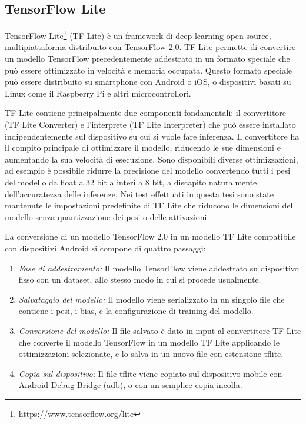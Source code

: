 \documentclass[12pt,italian]{report}
\begin{document}
\subsection{TensorFlow Lite}
TensorFlow Lite\footnote{\url{https://www.tensorflow.org/lite}} (TF Lite) è un framework di deep learning open-source, multipiattaforma distribuito con TensorFlow 2.0. TF Lite permette di convertire un modello TensorFlow precedentemente addestrato in un formato speciale che può essere ottimizzato in velocità e memoria occupata. Questo formato speciale può essere distribuito su smartphone con Android o iOS, o dispositivi basati su Linux come il Raspberry Pi e altri microcontrollori.

TF Lite contiene principalmente due componenti fondamentali:  il convertitore (TF Lite Converter) e l'interprete (TF Lite Interpreter) che può essere installato indipendentemente sul dispositivo su cui si vuole fare inferenza.  Il convertitore ha il compito principale di ottimizzare il modello, riducendo le sue dimensioni e aumentando la sua velocità di esecuzione. Sono disponibili diverse ottimizzazioni, ad esempio è possibile ridurre la precisione del modello convertendo tutti i pesi del modello da float a 32 bit a interi a 8 bit, a discapito naturalmente dell'accuratezza delle inferenze. Nei test effettuati in questa tesi sono state mantenute le impostazioni predefinite di TF Lite che riducono le dimensioni del modello senza quantizzazione dei pesi o delle attivazioni.

La conversione di un modello TensorFlow 2.0 in un modello TF Lite compatibile con dispositivi Android si compone di quattro passaggi:
\begin{enumerate}
\item \textit{Fase di addestramento:} Il modello TensorFlow viene addestrato su dispositivo fisso con un dataset, allo stesso modo in cui si procede usualmente.

\item \textit{Salvataggio del modello:} Il modello viene serializzato in un singolo file che contiene i pesi, i bias, e la configurazione di training del modello.

\item \textit{Conversione del modello:} Il file salvato è dato in input al convertitore TF Lite che converte il modello TensorFlow in un modello TF Lite applicando le ottimizzazioni selezionate, e lo salva in un nuovo file con estensione tflite.

\item \textit{Copia sul dispositivo:} Il file tflite viene copiato sul dispositivo mobile con  Android Debug Bridge (adb), o con un semplice copia-incolla.
\end{enumerate}
\end{document}
